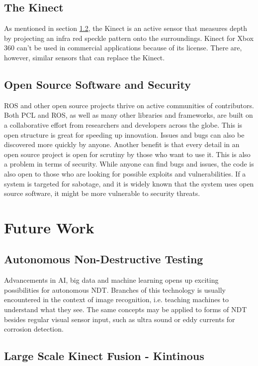 \subsection{The Kinect}

As mentioned in section \ref{}, the Kinect is an active sensor that measures depth by projecting an infra red speckle pattern onto the surroundings.  Kinect for Xbox 360 can't be used in commercial applications because of its license. There are, however, similar sensors that can replace the Kinect.

\subsection{Open Source Software and Security}

\ac{ROS} and other open source projects thrive on active communities of contributors. Both \ac{PCL} and \ac{ROS}, as well as many other libraries and frameworks, are built on a collaborative effort from researchers and developers across the globe. This is open structure is great for speeding up innovation. Issues and bugs can also be discovered more quickly by anyone. Another benefit is that every detail in an open source project is open for scrutiny by those who want to use it. This is also a problem in terms of security. While anyone can find bugs and issues, the code is also open to those who are looking for possible exploits and vulnerabilities. If a system is targeted for sabotage, and it is widely known that the system uses open source software, it might be more vulnerable to security threats.

\section{Future Work}

\subsection{Autonomous Non-Destructive Testing}

Advancements in \ac{AI}, big data and machine learning opens up exciting possibilities for autonomous \ac{NDT}. Branches of this technology is usually encountered in the context of image recognition, i.e. teaching machines to understand what they see. The same concepts may be applied to forms of \ac{NDT} besides regular visual sensor input, such as ultra sound or eddy currents for corrosion detection.  

\subsection{Large Scale Kinect Fusion - Kintinous}

